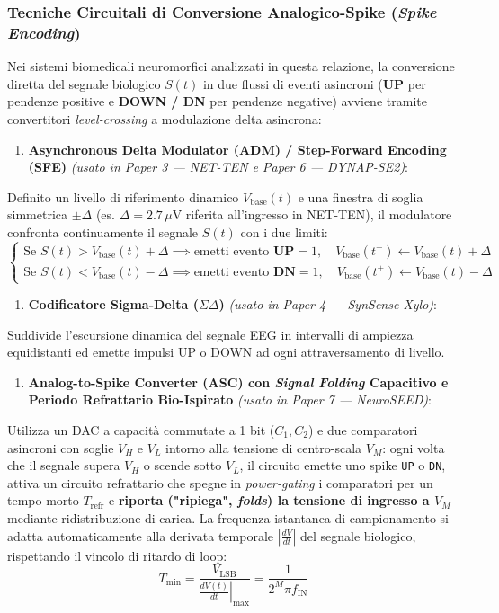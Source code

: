 \documentclass[11pt,a4paper]{article}
\begin{document}
\subsubsection{Tecniche Circuitali di Conversione Analogico-Spike (\textit{Spike Encoding})}
Nei sistemi biomedicali neuromorfici analizzati in questa relazione, la conversione diretta del segnale biologico $S(t)$ in due flussi di eventi asincroni (\textbf{UP} per pendenze positive e \textbf{DOWN / DN} per pendenze negative) avviene tramite convertitori \textit{level-crossing} a modulazione delta asincrona:

\begin{enumerate}
  \item \textbf{Asynchronous Delta Modulator (ADM) / Step-Forward Encoding (SFE)} \textit{(usato in Paper 3 --- NET-TEN e Paper 6 --- DYNAP-SE2)}:
\end{enumerate}
Definito un livello di riferimento dinamico $V_{\text{base}}(t)$ e una finestra di soglia simmetrica $\pm \Delta$ (es. $\Delta = 2.7\,\mu\text{V}$ riferita all'ingresso in NET-TEN), il modulatore confronta continuamente il segnale $S(t)$ con i due limiti:
\[
\begin{cases}
   \text{Se } S(t) > V_{\text{base}}(t) + \Delta \implies \text{emetti evento } \mathbf{UP} = 1, \quad V_{\text{base}}(t^+) \leftarrow V_{\text{base}}(t) + \Delta \\
   \text{Se } S(t) < V_{\text{base}}(t) - \Delta \implies \text{emetti evento } \mathbf{DN} = 1, \quad V_{\text{base}}(t^+) \leftarrow V_{\text{base}}(t) - \Delta
   \end{cases}
\]
\begin{enumerate}
  \item \textbf{Codificatore Sigma-Delta ($\Sigma\Delta$)} \textit{(usato in Paper 4 --- SynSense Xylo)}:
\end{enumerate}
Suddivide l'escursione dinamica del segnale EEG in intervalli di ampiezza equidistanti ed emette impulsi UP o DOWN ad ogni attraversamento di livello.
\begin{enumerate}
  \item \textbf{Analog-to-Spike Converter (ASC) con \textit{Signal Folding} Capacitivo e Periodo Refrattario Bio-Ispirato} \textit{(usato in Paper 7 --- NeuroSEED)}:
\end{enumerate}
Utilizza un DAC a capacità commutate a 1 bit ($C_1, C_2$) e due comparatori asincroni con soglie $V_H$ e $V_L$ intorno alla tensione di centro-scala $V_M$: ogni volta che il segnale supera $V_H$ o scende sotto $V_L$, il circuito emette uno spike \texttt{UP} o \texttt{DN}, attiva un circuito refrattario che spegne in \textit{power-gating} i comparatori per un tempo morto $T_{\text{refr}}$ e \textbf{riporta ("ripiega", \textit{folds}) la tensione di ingresso a $V_M$} mediante ridistribuzione di carica. La frequenza istantanea di campionamento si adatta automaticamente alla derivata temporale $\left|\frac{dV}{dt}\right|$ del segnale biologico, rispettando il vincolo di ritardo di loop:
\[
T_{\min} = \frac{V_{\text{LSB}}}{\left.\frac{dV(t)}{dt}\right|_{\max}} = \frac{1}{2^M \pi f_{\text{IN}}}
\]
\end{document}
